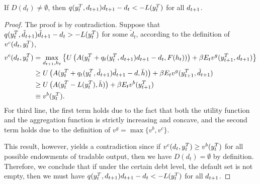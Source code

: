 \begin{proposition}
    \label{prop1}
    If $D(d_t) \neq \emptyset$, then $q(y^T_{t}, d_{t+1})d_{t+1} - d_t < -L(y^T_{t})$ for all $d_{t+1}$.
\end{proposition}
\begin{proof}
    The proof is by contradiction. Suppose that $q(y^T_{t}, \tilde{d}_{t+1})\tilde{d}_{t+1} - d_t > -L(y^T_{t})$ for some $\tilde{d}_t$, according to the definition of $v^c(d_t, y^T_{t})$,
    \begin{align*}
        v^c(d_t, y^T_{t}) &= \max_{d_{t+1}, h_t} \left\{
            U\left( A(y^T_{t} + q_t(y^T_{t}, d_{t+1}) d_{t+1} - d_t, F(h_t)) \right) +
            \beta E_t v^g(y^T_{t+1}, d_{t+1})
         \right\}\\
         &\ge U\left( A(y^T_{t} + q_t(y^T_{t}, \tilde{d}_{t+1}) \tilde{d}_{t+1} - d, \bar{h}) \right) +
            \beta E_t v^g(y^T_{t+1}, \tilde{d}_{t+1}) \\
         &\ge U\left( A(y^T_{t} -L(y^T_{t}), \bar{h}) \right) +
            \beta E_t v^b(y^T_{t+1}) \\
        &\equiv v^b(y^T_{t}).
    \end{align*}
    For third line, the first term holds due to the fact that both the utility function and the aggregation function is strictly increasing and concave, and the second term holds due to the definition of  $v^g = \max\{v^b, v^c\}$.

    This result, however, yields a contradiction since if $v^c(d_t, y^T_{t}) \ge v^b(y^T_{t})$ for all possible endowments of tradable output, then we have $D(d_t) = \emptyset$ by definition. Therefore, we conclude that if under the certain debt level, the default set is not empty, then we must have $q(y^T_{t}, d_{t+1})d_{t+1} - d_t < -L(y^T_{t})$ for all $d_{t+1}$.
\end{proof}

